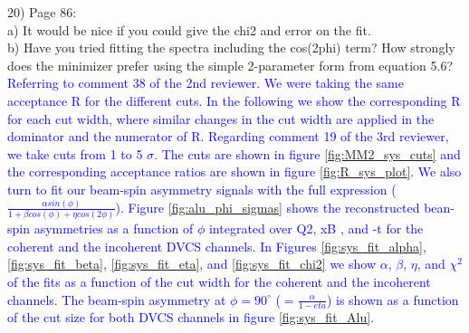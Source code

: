 20) Page 86:\\
  a) It would be nice if you could give the chi2 and error on the fit.\\
  b) Have you tried fitting the spectra including the cos(2phi) term? How 
strongly does the minimizer prefer using the simple 2-parameter form from 
equation 5.6?\\
 
\textcolor{blue}{ Referring to comment 38 of the 2nd reviewer. We were taking 
the same acceptance R for the different cuts. In the following we show the 
corresponding R for each cut width, where similar changes in the cut width are 
applied in the dominator and the numerator of R. Regarding comment 19 of the 
3rd reviewer, we take cuts from 1 to 5 $\sigma$.  The cuts are shown in figure 
\ref{fig:MM2_sys_cuts} and the corresponding acceptance ratios are shown in 
figure \ref{fig:R_sys_plot}. We also turn to fit our beam-spin asymmetry 
signals with the full expression ($\frac{\alpha sin(\phi)}{1 + \beta cos(\phi) 
+ \eta cos(2\phi)}$). Figure \ref{fig:alu_phi_sigmas} shows the reconstructed 
bean-spin asymmetries as a function of $\phi$ integrated over Q2, xB , and -t 
for the coherent and the incoherent DVCS channels. In Figures 
\ref{fig:sys_fit_alpha}, \ref{fig:sys_fit_beta}, \ref{fig:sys_fit_eta}, and 
\ref{fig:sys_fit_chi2} we show $\alpha$, $\beta$, $\eta$, and $\chi^{2}$ of the 
fits as a function of the cut width for the coherent and the incoherent 
channels. The beam-spin asymmetry at $\phi = 90 ^{\circ}$ ($= 
\frac{\alpha}{1-eta}$) is shown as a function of the cut size for both DVCS 
channels in figure \ref{fig:sys_fit_Alu}. }

